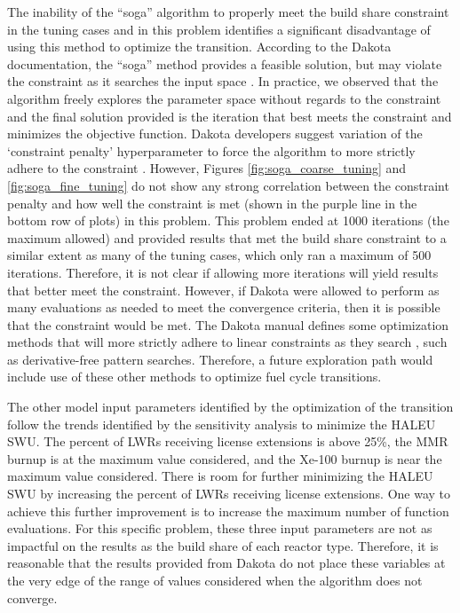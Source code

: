The inability of the ``soga'' algorithm to properly meet the build share 
constraint in the tuning cases and in this problem identifies a significant 
disadvantage of using this method to optimize the transition. According to the 
Dakota documentation, the ``soga'' method provides a feasible solution, but
may violate the constraint as it searches the input space \cite{noauthor_dakota_2021}.
In practice, we observed that the algorithm freely explores the parameter space 
without regards to the constraint and the final solution provided is the 
iteration that best meets the constraint and minimizes the objective function.
Dakota developers suggest variation of the `constraint penalty' hyperparameter 
to force the algorithm to more strictly adhere to the constraint 
\cite{noauthor_optimization_2023}. 
However, Figures \ref{fig:soga_coarse_tuning} and \ref{fig:soga_fine_tuning}
do not show any strong correlation between the constraint penalty and how 
well the constraint is met (shown in the purple line in the bottom row of 
plots) in this problem. This problem ended at 1000 iterations (the maximum 
allowed) and 
provided results that met the build share constraint to a similar 
extent as many of the tuning cases, which only ran a maximum of 500 iterations. 
Therefore, it is not clear if allowing more iterations will yield results that 
better meet the constraint. However, if Dakota were allowed to perform 
as many evaluations as needed to meet the convergence criteria, then 
it is possible that the constraint would be met. The Dakota manual defines 
some optimization 
methods that will more strictly adhere to linear constraints as they search
\cite{noauthor_dakota_2021}, such as derivative-free pattern searches. 
Therefore, a future exploration path would include use of these other 
methods to optimize fuel cycle transitions. 

The other model input parameters identified by the optimization 
of the transition follow the trends identified by the 
sensitivity analysis to minimize the \gls{HALEU} \gls{SWU}. 
The percent of \glspl{LWR} receiving license extensions
is above 25\%, the \gls{MMR} burnup is at the maximum value considered, 
and the Xe-100 burnup is near the maximum value considered. There is 
room for further minimizing the \gls{HALEU} \gls{SWU} by increasing 
the percent of \glspl{LWR} receiving license extensions. One way to 
achieve this further improvement is to increase the maximum 
number of function evaluations. For this specific 
problem, these three input parameters are not as impactful on the results as the 
build share of each reactor type. Therefore, it is reasonable that the 
results provided from Dakota do not place these variables at the very 
edge of the range of values considered when the algorithm does not 
converge. 

